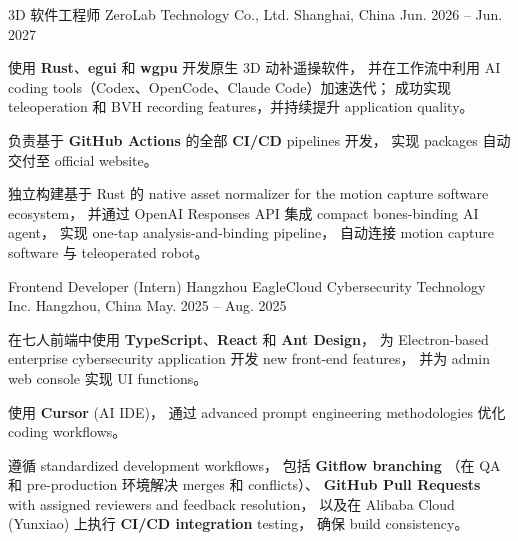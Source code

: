 
\begin{cventries}
	\cventry
	{3D 软件工程师} %
	{ZeroLab Technology Co., Ltd.} %
	{Shanghai, China} %
	{Jun. 2026 -- Jun. 2027} %
	{
		\begin{cvitems} %
			\item
			      {
			            使用 \textbf{Rust}、\textbf{egui} 和 \textbf{wgpu} 开发原生 3D 动补遥操软件，
			            并在工作流中利用 AI coding tools（Codex、OpenCode、Claude Code）加速迭代；
			            成功实现 teleoperation 和 BVH recording features，并持续提升 application quality。
			      }
			\item
			      {
			            负责基于 \textbf{GitHub Actions} 的全部 \textbf{CI/CD} pipelines 开发，
			            实现 packages 自动交付至 official website。
			      }
			\item
			      {
			            独立构建基于 Rust 的 native asset normalizer for the motion capture software ecosystem，
			            并通过 OpenAI Responses API 集成 compact bones-binding AI agent，
			            实现 one-tap analysis-and-binding pipeline，
			            自动连接 motion capture software 与 teleoperated robot。
			      }
		\end{cvitems}
	}

	\cventry
	{Frontend Developer (Intern)} %
	{Hangzhou EagleCloud Cybersecurity Technology Inc.} %
	{Hangzhou, China} %
	{May. 2025 -- Aug. 2025} %
	{
		\begin{cvitems} %
			\item
			      {
			            在七人前端中使用 \textbf{TypeScript}、\textbf{React} 和 \textbf{Ant Design}，
			            为 Electron-based enterprise cybersecurity application 开发 new front-end features，
			            并为 admin web console 实现 UI functions。
			      }
			\item
			      {
			            使用 \textbf{Cursor} (AI IDE)，
			            通过 advanced prompt engineering methodologies 优化 coding workflows。
			      }
			\item
			      {遵循 standardized development workflows，
			            包括 \textbf{Gitflow branching}
			            （在 QA 和 pre-production 环境解决 merges 和 conflicts）、
			            \textbf{GitHub Pull Requests} with assigned reviewers and feedback resolution，
			            以及在 Alibaba Cloud (Yunxiao) 上执行 \textbf{CI/CD integration} testing，
			            确保 build consistency。
			      }
		\end{cvitems}
	}
\end{cventries}
